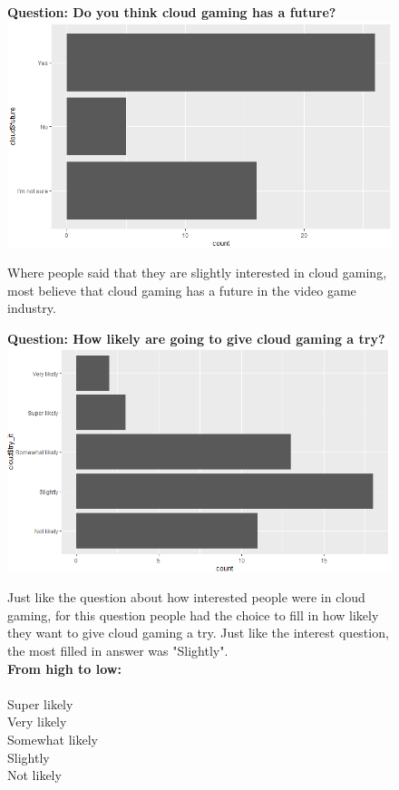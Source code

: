 \begin{figure}[ht]
	\centering
	\textbf{Question: Do you think cloud gaming has a future?}
	\includegraphics[width=12cm]{../img/future.png}
	\caption{Where people said that they are slightly interested in cloud gaming, most believe that cloud gaming has a future in the video game industry.}
\end{figure}
\begin{figure}[ht]
	\centering
	\textbf{Question: How likely are going to give cloud gaming a try?}
	\includegraphics[width=12cm]{../img/try.png}
	\caption{Just like the question about how interested people were in cloud gaming, for this question people had the choice to fill in how likely they want to give cloud gaming a try. Just like the interest question, the most filled in answer was "Slightly". \\\textbf{From high to low:}\\\\
		Super likely\\
		Very likely\\
		Somewhat likely\\
		Slightly\\
		Not likely}
\end{figure}
